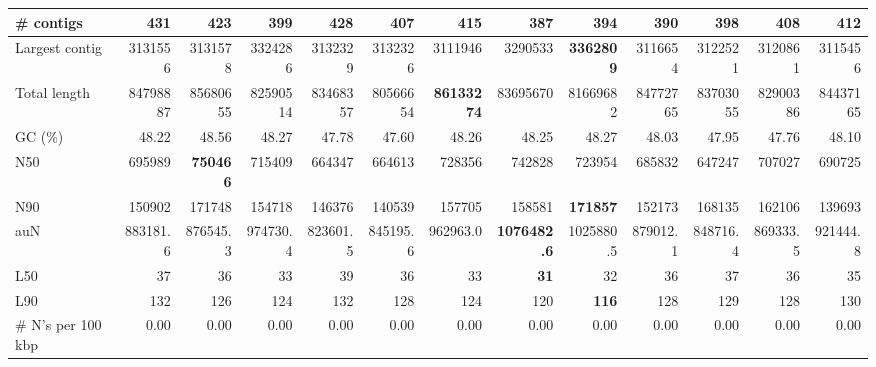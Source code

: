 \documentclass[12pt,a4paper]{article}
\begin{document}
\begin{table}[ht]
\begin{center}
\begin{tabular}{|l*{12}{|r}|}
\# contigs & 431 & 423 & 399 & 428 & 407 & 415 & 387 & 394 & 390 & 398 & 408 & 412 \\ \hline
Largest contig & 3131556 & 3131578 & 3324286 & 3132329 & 3132326 & 3111946 & 3290533 & {\bf 3362809} & 3116654 & 3122521 & 3120861 & 3115456 \\ \hline
Total length & 84798887 & 85680655 & 82590514 & 83468357 & 80566654 & {\bf 86133274} & 83695670 & 81669682 & 84772765 & 83703055 & 82900386 & 84437165 \\ \hline
GC (\%) & 48.22 & 48.56 & 48.27 & 47.78 & 47.60 & 48.26 & 48.25 & 48.27 & 48.03 & 47.95 & 47.76 & 48.10 \\ \hline
N50 & 695989 & {\bf 750466} & 715409 & 664347 & 664613 & 728356 & 742828 & 723954 & 685832 & 647247 & 707027 & 690725 \\ \hline
N90 & 150902 & 171748 & 154718 & 146376 & 140539 & 157705 & 158581 & {\bf 171857} & 152173 & 168135 & 162106 & 139693 \\ \hline
auN & 883181.6 & 876545.3 & 974730.4 & 823601.5 & 845195.6 & 962963.0 & {\bf 1076482.6} & 1025880.5 & 879012.1 & 848716.4 & 869333.5 & 921444.8 \\ \hline
L50 & 37 & 36 & 33 & 39 & 36 & 33 & {\bf 31} & 32 & 36 & 37 & 36 & 35 \\ \hline
L90 & 132 & 126 & 124 & 132 & 128 & 124 & 120 & {\bf 116} & 128 & 129 & 128 & 130 \\ \hline
\# N's per 100 kbp & 0.00 & 0.00 & 0.00 & 0.00 & 0.00 & 0.00 & 0.00 & 0.00 & 0.00 & 0.00 & 0.00 & 0.00 \\ \hline
\end{tabular}
\end{center}
\end{table}
\end{document}
